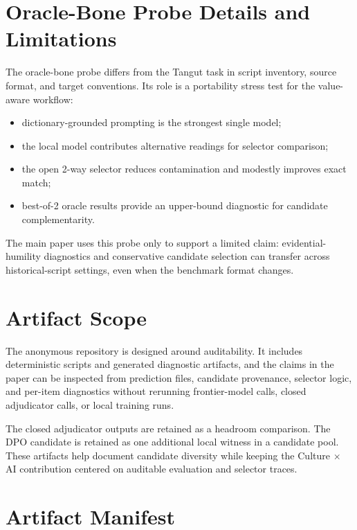 \documentclass{article}
\begin{document}
\section{Oracle-Bone Probe Details and Limitations}

The oracle-bone probe differs from the Tangut task in script inventory, source format, and target conventions. Its role is a portability stress test for the value-aware workflow:
\begin{itemize}
    \item dictionary-grounded prompting is the strongest single model;
    \item the local model contributes alternative readings for selector comparison;
    \item the open 2-way selector reduces contamination and modestly improves exact match;
    \item best-of-2 oracle results provide an upper-bound diagnostic for candidate complementarity.
\end{itemize}

The main paper uses this probe only to support a limited claim: evidential-humility diagnostics and conservative candidate selection can transfer across historical-script settings, even when the benchmark format changes.

\section{Artifact Scope}

The anonymous repository is designed around auditability. It includes deterministic scripts and generated diagnostic artifacts, and the claims in the paper can be inspected from prediction files, candidate provenance, selector logic, and per-item diagnostics without rerunning frontier-model calls, closed adjudicator calls, or local training runs.

The closed adjudicator outputs are retained as a headroom comparison. The DPO candidate is retained as one additional local witness in a candidate pool. These artifacts help document candidate diversity while keeping the Culture $\times$ AI contribution centered on auditable evaluation and selector traces.

\section{Artifact Manifest}
\end{document}

